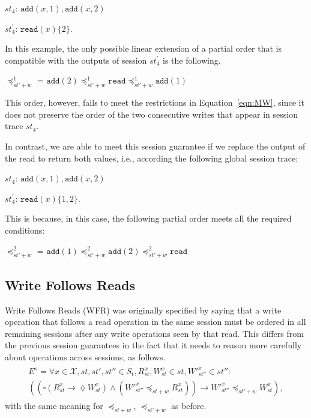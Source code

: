 \documentclass[journal,compsoc]{IEEEtran}
\begin{document}
 $\mathit{st}_4$: $\texttt{add}(x,1),\texttt{add}(x,2)$ 

$\mathit{st}_4^{'}$: $\texttt{read}(x){\{2\}}$. 

In this example, the only possible linear extension of a partial order that is compatible with the outputs of session $\mathit{st}_4^{'}$ is the following.

  
  \noindent $\preccurlyeq_{\mathit{st'}+w}^1$ = $\texttt{add}(2) \preccurlyeq_{\mathit{st'}+w}^1  \texttt{read} \preccurlyeq_{\mathit{st'}+w}^1 \texttt{add}(1)$

This order, however, fails to meet the restrictions in Equation~\ref{eqn:MW}, since it does not preserve the order of the two consecutive writes that appear in session trace $\mathit{st}_4$.

In contrast, we are able to meet this session guarantee if we replace the output of the read to return both values, i.e., according the following global session trace:


 $\mathit{st}_4$: $\texttt{add}(x,1),\texttt{add}(x,2)$ 

$\mathit{st}_4^{'}$: $\texttt{read}(x){\{1,2\}}$. 

This is because, in this case, the following partial order meets all the required conditions:

  \noindent $\preccurlyeq_{\mathit{st'}+w}^2$ = $\texttt{add}(1) \preccurlyeq_{\mathit{st'}+w}^2  \texttt{add}(2) \preccurlyeq_{\mathit{st'}+w}^2 \texttt{read}$




\subsection{Write Follows Reads}

Write Follows Reads (WFR)  was originally specified by saying that a write operation that follows a read operation in the same session must be ordered in all remaining sessions after any write operations seen by that read. This differs from the previous session guarantees in the fact that it needs to reason more carefully about operations across sessions, as follows. \\
 \begin{align}\label{eqn:WFR}
\begin{split}
   E^{s} =    \forall x \in \mathcal{X}, \mathit{st}, \mathit{st'}, \mathit{st''} \in \mathit{S_t}, R_\mathit{st}^x,  W_\mathit{st}^x \in \mathit{st}, W'^x_\mathit{st''} \in \mathit{st''}:  \\ 
   \left(  \left( 
   \square \left( R^x_{\mathit{st}} \rightarrow \lozenge W^x_{\mathit{st}} \right)  
   \wedge 
   \left(  W'^x_\mathit{st''} \preccurlyeq_{\mathit{st}+w} R^x_{\mathit{st}} \right) 
   \right) 
 \rightarrow 
W'^x_{\mathit{st}''} \preccurlyeq_{\mathit{st'}+w} W_{\mathit{st}}^x \right), 
\end{split}
  \end{align} 
with the same meaning for $\preccurlyeq_{\mathit{st}+w}$, $\preccurlyeq_{\mathit{st}'+w}$ as before.
\end{document}
